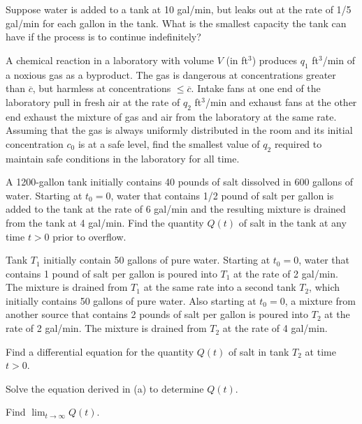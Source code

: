 \begin{exerciselist}
\item\label{exer:4.2.12}Suppose  water is added to a tank at 10 gal/min, but leaks
out at the rate of 1/5 gal/min for each gallon in the tank.
What is the smallest capacity the tank can have if the
process is to continue indefinitely?

\item\label{exer:4.2.13}A chemical reaction in a laboratory with volume $V$ (in ft$^3$)
produces $q_1$ ft$^3$/min of a noxious gas as a byproduct. The gas is
dangerous at concentrations greater than $\overline c$,
 but harmless at
concentrations $\le \overline c$. Intake fans at one end of the
laboratory pull in fresh air at the rate of $q_2$ ft$^3$/min and
exhaust fans at the other end exhaust the mixture of gas and air from
the
laboratory at the same rate. Assuming that the gas is always uniformly
distributed in the room and its initial concentration $c_0$ is at a
safe level, find the smallest value of $q_2$ required to maintain safe
conditions in the laboratory for all time.





\item\label{exer:4.2.14}A 1200-gallon tank initially contains 40 pounds of salt
dissolved in 600 gallons of water.  Starting at $t_0=0$,
water that contains 1/2 pound of salt per gallon is added to
the tank at the rate of 6 gal/min and the
resulting mixture  is drained from the tank at 4 gal/min.  Find the
quantity $Q(t)$ of salt in the tank at any time $t > 0$
prior to overflow.



\item\label{exer:4.2.15}Tank $T_1$  initially contain 50 gallons of pure water. Starting at
$t_0=0$,  water that contains 1 pound of salt per gallon is poured into
$T_1$ at  the rate of  2 gal/min.
The  mixture is drained from
$T_1$ at the same rate into a second tank $T_2$, which initially
contains  50 gallons of pure water.  Also starting at
$t_0=0$, a mixture from another source that contains 2  pounds of salt
per gallon is poured
into $T_2$  at the rate of 2 gal/min.  The  mixture is drained
from $T_2$ at the rate of 4 gal/min.


\begin{alist}
\item %
 Find a differential
equation for the quantity $Q(t)$ of salt in  tank $T_2$ at time $t > 0$.
\item %
Solve the equation derived  in (a) to determine $Q(t)$.
\item %
 Find $\lim_{t\to\infty}Q(t)$.
\end{alist}



\end{exerciselist}
